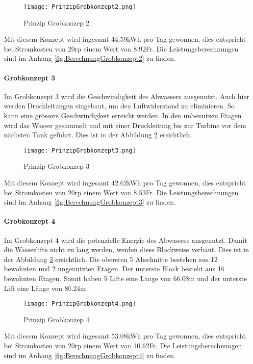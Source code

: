 \begin{figure} [H]
	\centering
	\texttt{[image: PrinzipGrobkonzept2.png]}
	\caption{Prinzip Grobkonzep 2}
	\label{fig:PrinzipGrobkonzept2}
\end{figure}

Mit diesem Konzept wird ingesamt 44.59\si{kWh} pro Tag gewonnen, dies entspricht bei Stromkosten von 20\si{rp} einem Wert von 8.92\si{Fr}. Die Leistungsberechnungen sind im Anhang \ref{fig:BerechnungGrobkonzept2}  zu finden.

\newpage

\paragraph{Grobkonzept 3}

Im Grobkonzept 3 wird die Geschwindigkeit des Abwassers ausgenutzt. Auch hier werden Druckleitungen eingebaut, um den Luftwiderstand zu eliminieren. So kann eine grössere Geschwindigkeit erreicht werden. In den unbenutzen Etagen wird das Wasser gesammelt und mit einer Druckleitung bis zur Turbine vor dem nächsten Tank geführt. Dies ist in der Abbildung \ref{fig:PrinzipGrobkonzept3}  ersichtlich. 

\begin{figure} [H]
	\centering
	\texttt{[image: PrinzipGrobkonzept3.png]}
	\caption{Prinzip Grobkonzep 3}
	\label{fig:PrinzipGrobkonzept3}
\end{figure}

Mit diesem Konzept wird ingesamt 42.62\si{kWh} pro Tag gewonnen, dies entspricht bei Stromkosten von 20\si{rp} einem Wert von 8.53\si{Fr}. Die Leistungsberechnungen sind im Anhang \ref{fig:BerechnungGrobkonzept3}  zu finden.

\newpage

\paragraph{Grobkonzept 4}

Im Grobkonzept 4 wird die potenzielle Energie des Abwassers ausgenutzt. Damit die Wasserlifte nicht zu lang werden, werden diese Blockweise verbaut. Dies ist in der Abbildung \ref{fig:PrinzipGrobkonzept4}  ersichtlich. Die obersten 5 Abschnitte bestehen aus 12 bewohnten und 2 ungenutzten Etagen. Der unterste Block besteht aus 16 bewohnten Etagen. Somit haben 5 Lifte eine Länge von 66.08\si{m} und der unterste Lift eine Länge von 80.24\si{m}

\begin{figure} [H]
	\centering
	\texttt{[image: PrinzipGrobkonzept4.png]}
	\caption{Prinzip Grobkonzep 4}
	\label{fig:PrinzipGrobkonzept4}
\end{figure}

Mit diesem Konzept wird ingesamt 53.08\si{kWh} pro Tag gewonnen, dies entspricht bei Stromkosten von 20\si{rp} einem Wert von 10.62\si{Fr}. Die Leistungsberechnungen sind im Anhang \ref{fig:BerechnungGrobkonzept4}  zu finden.

\newpage
